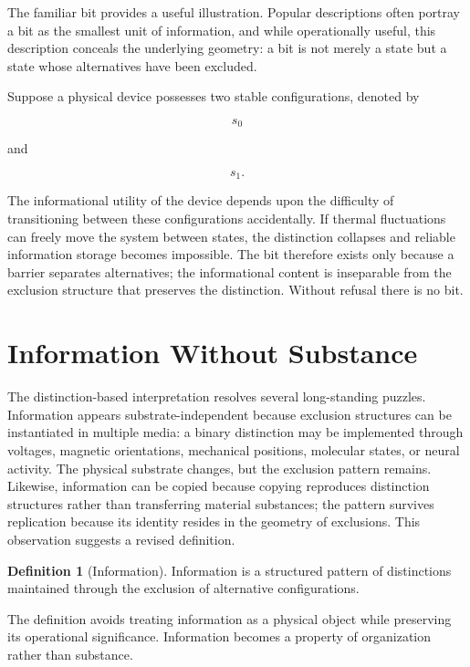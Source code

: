 \documentclass[11pt,oneside]{book}
\theoremstyle{plain}
\theoremstyle{definition}
\newtheorem{definition}[theorem]{Definition}
\theoremstyle{remark}
\begin{document}
The familiar bit provides a useful illustration. Popular descriptions often portray a bit as the smallest unit of information, and while operationally useful, this description conceals the underlying geometry: a bit is not merely a state but a state whose alternatives have been excluded.

Suppose a physical device possesses two stable configurations, denoted by

\begin{equation}
s_0
\end{equation}

and

\begin{equation}
s_1.
\end{equation}

The informational utility of the device depends upon the difficulty of transitioning between these configurations accidentally. If thermal fluctuations can freely move the system between states, the distinction collapses and reliable information storage becomes impossible. The bit therefore exists only because a barrier separates alternatives; the informational content is inseparable from the exclusion structure that preserves the distinction. Without refusal there is no bit.

\section{Information Without Substance}

The distinction-based interpretation resolves several long-standing puzzles. Information appears substrate-independent because exclusion structures can be instantiated in multiple media: a binary distinction may be implemented through voltages, magnetic orientations, mechanical positions, molecular states, or neural activity. The physical substrate changes, but the exclusion pattern remains. Likewise, information can be copied because copying reproduces distinction structures rather than transferring material substances; the pattern survives replication because its identity resides in the geometry of exclusions. This observation suggests a revised definition.

\begin{definition}[Information]
Information is a structured pattern of distinctions maintained through the exclusion of alternative configurations.
\end{definition}

The definition avoids treating information as a physical object while preserving its operational significance. Information becomes a property of organization rather than substance.
\end{document}
